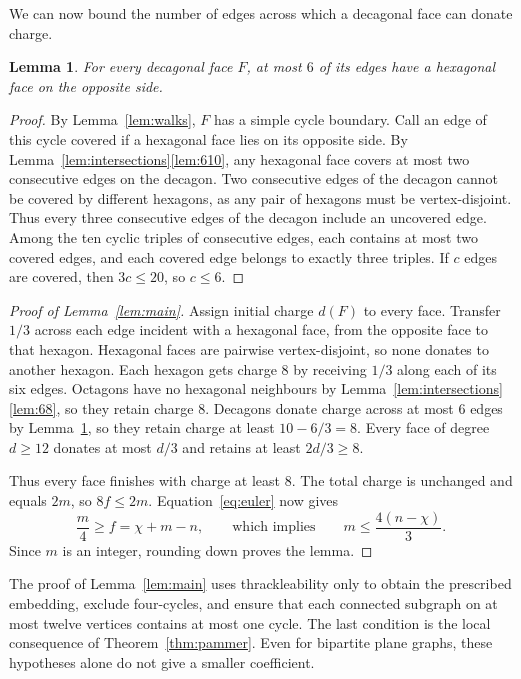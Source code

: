 \documentclass[11pt,a4paper]{article}
\newtheorem{lemma}[theorem]{Lemma}
\begin{document}
We can now bound the number of edges across which a decagonal face can donate charge.

\begin{lemma}\label{lem:decagon}
For every decagonal face $F$, at most $6$ of its edges have a hexagonal
face on the opposite side.
\end{lemma}

\begin{proof}
By Lemma~\ref{lem:walks}, $F$ has a simple cycle boundary. Call an edge
of this cycle covered if a hexagonal face lies on its opposite side.
By Lemma~\ref{lem:intersections}\ref{lem:610}, any hexagonal face covers at most two
consecutive edges on the decagon. Two consecutive edges of the decagon
cannot be covered by different hexagons, as any pair of hexagons must
be vertex-disjoint. Thus every three consecutive edges of the decagon include an uncovered
edge. Among the ten cyclic triples of consecutive edges, each contains
at most two covered edges, and each covered edge belongs to exactly
three triples. If $c$ edges are covered, then $3c\le20$, so $c\le6$.
\end{proof}

\begin{proof}[Proof of Lemma~\ref{lem:main}]
Assign initial charge $d(F)$ to every face. Transfer $1/3$ across each
edge incident with a hexagonal face, from the opposite face to that
hexagon. Hexagonal faces are pairwise vertex-disjoint, so none donates
to another hexagon. Each hexagon gets charge $8$ by receiving $1/3$
along each of its six edges. Octagons have no hexagonal neighbours by
Lemma~\ref{lem:intersections}\ref{lem:68}, so they retain charge $8$. Decagons donate charge
across at most $6$ edges by Lemma~\ref{lem:decagon}, so they retain
charge at least $10-6/3=8$. Every face of degree $d\ge12$ donates at
most $d/3$ and retains at least $2d/3\ge8$.

Thus every face finishes with charge at least $8$. The total charge is
unchanged and equals $2m$, so $8f\le2m$. Equation~\eqref{eq:euler} now gives
\[
 \frac m4\ge f=\chi+m-n,
 \qquad\text{which implies}\qquad
 m\le\frac{4(n-\chi)}3.
\]
Since $m$ is an integer, rounding down proves the lemma.
\end{proof}

The proof of Lemma~\ref{lem:main} uses thrackleability only to obtain
the prescribed embedding, exclude four-cycles, and ensure that each
connected subgraph on at most twelve vertices contains at most one
cycle. The last condition is the local consequence of
Theorem~\ref{thm:pammer}. Even for bipartite plane graphs, these
hypotheses alone do not give a smaller coefficient.
\end{document}

